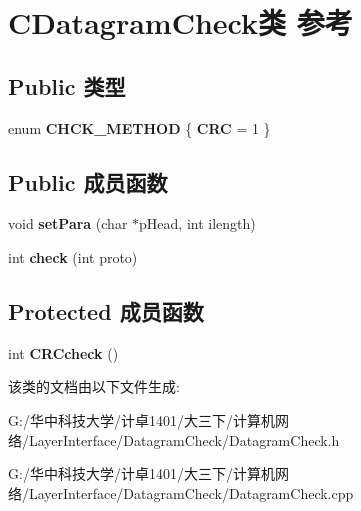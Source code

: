 \hypertarget{class_c_datagram_check}{}\section{C\+Datagram\+Check类 参考}
\label{class_c_datagram_check}
\subsection*{Public 类型}
\begin{DoxyCompactItemize}
\item 
\mbox{\label{class_c_datagram_check_a291cad3176f8806883c6285957431b64}} 
enum {\bfseries C\+H\+C\+K\+\_\+\+M\+E\+T\+H\+OD} \{ {\bfseries C\+RC} = 1
 \}
\end{DoxyCompactItemize}
\subsection*{Public 成员函数}
\begin{DoxyCompactItemize}
\item 
\mbox{\label{class_c_datagram_check_ac607f6742d36faec27f6462aefb6abaf}} 
void {\bfseries set\+Para} (char $\ast$p\+Head, int ilength)
\item 
\mbox{\label{class_c_datagram_check_a9f21ffeb4696f31eb8af68b09cf17686}} 
int {\bfseries check} (int proto)
\end{DoxyCompactItemize}
\subsection*{Protected 成员函数}
\begin{DoxyCompactItemize}
\item 
\mbox{\label{class_c_datagram_check_af7314fcfc87618386920fcb567f6f5d7}} 
int {\bfseries C\+R\+Ccheck} ()
\end{DoxyCompactItemize}


该类的文档由以下文件生成\+:\begin{DoxyCompactItemize}
\item 
G\+:/华中科技大学/计卓1401/大三下/计算机网络/\+Layer\+Interface/\+Datagram\+Check/Datagram\+Check.\+h\item 
G\+:/华中科技大学/计卓1401/大三下/计算机网络/\+Layer\+Interface/\+Datagram\+Check/Datagram\+Check.\+cpp\end{DoxyCompactItemize}
